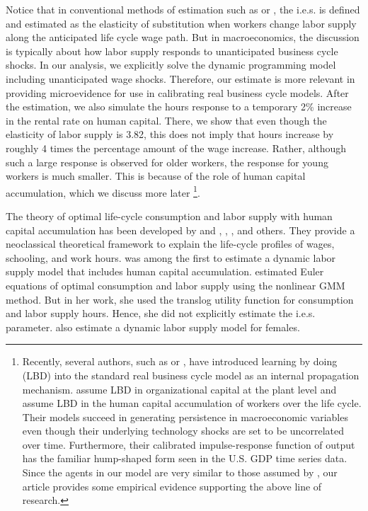 \documentclass{article}
\begin{document}
Notice that in conventional methods of estimation such as \cite{MaCurdy1981-iy} or  \cite{Altonji1986-zf}, the i.e.s. is defined and estimated as the elasticity of substitution when workers change labor supply along the anticipated life cycle wage path. But in macroeconomics, the discussion is typically about how labor supply responds to unanticipated business cycle shocks. In our analysis, we explicitly solve the dynamic programming model including unanticipated wage shocks. Therefore, our estimate is more relevant in providing microevidence for use in calibrating real business cycle models. After the estimation, we also simulate the hours response to a temporary 2\% increase in the rental rate on human capital. There, we show that even though the elasticity of labor supply is 3.82, this does not imply that hours increase by roughly 4 times the percentage amount of the wage increase. Rather, although such a large response is observed for older workers, the response for young workers is much smaller. This is because of the role of human capital accumulation, which we discuss more later \footnote[3]{Recently, several authors, such as \cite{Cooper1999-af} or \cite{Chang2002-zs}, have introduced learning by doing (LBD) into the standard real business cycle model as an internal propagation mechanism. \cite{Cooper1999-af} assume LBD in organizational capital at the plant level and \cite{Chang2002-zs} assume LBD in the human capital accumulation of workers over the life cycle. Their models succeed in generating persistence in macroeconomic variables even though their underlying technology shocks are set to be uncorrelated over time. Furthermore, their calibrated impulse-response function of output has the familiar hump-shaped form seen in the U.S. GDP time series data. Since the agents in our model are very similar to those assumed by \cite{Chang2002-zs}, our article provides some empirical evidence supporting the above line of research.}. \par
The theory of optimal life-cycle consumption and labor supply with human capital accumulation has been developed by \cite{Heckman1976-lb} and \cite{Heckman1976-lc}, \cite{Ben-Porath1967-sf}, \cite{Blinder1976-dv}, and others. They provide a neoclassical theoretical framework to explain the life-cycle profiles of wages, schooling, and work hours. \cite{Shaw1989-jb} was among the first to estimate a dynamic labor supply model that includes human capital accumulation. \cite{Shaw1989-jb} estimated Euler equations of optimal consumption and labor supply using the nonlinear GMM method. But in her work, she used the translog utility function for consumption and labor supply hours. Hence, she did not explicitly estimate the i.e.s. parameter. \cite{Altug1998-ou} also estimate a dynamic labor supply model for females. \par
\end{document}
